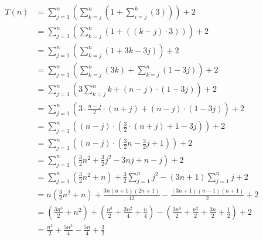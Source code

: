\documentclass{article}
\begin{document}
\begin{align*}
    T(n) &= \sum_{j=1}^{n} \left(
                \sum_{k=j}^{n}\left(
                    1 + \sum_{i=j}^{k}\left(3\right)
                \right)
            \right) + 2 \\
         &= \sum_{j=1}^{n} \left(
                \sum_{k=j}^{n}\left(
                    1 + ((k-j) \cdot 3)
                \right)
            \right) + 2 \\ 
        &= \sum_{j=1}^{n} \left(
                \sum_{k=j}^{n}\left(
                    1 + 3k - 3j
                \right)
            \right) + 2 \\
        &= \sum_{j=1}^{n} \left(
                \sum_{k=j}^{n}\left(
                    3k
                \right) +
                \sum_{k=j}^{n}\left(
                    1 - 3j
                \right)
            \right) + 2 \\
        &= \sum_{j=1}^{n} \left(
                3 \sum_{k=j}^{n}
                    k
                 +
                (n-j) \cdot (1 - 3j)
            \right) + 2 \\
        &= \sum_{j=1}^{n} \left(
                3 \cdot \frac{n-j}{2} \cdot (n + j)
                 +
                (n-j) \cdot (1 - 3j)
            \right) + 2 \\
        &= \sum_{j=1}^{n} \left(
                (n-j) \cdot \left(
                    \frac{3}{2} \cdot (n + j)
                    + 1 - 3j
                \right)
            \right) + 2 \\
        &= \sum_{j=1}^{n} \left(
                (n-j) \cdot \left(
                    \frac{3}{2} n
                    - \frac{3}{2}j
                    + 1
                \right)
            \right) + 2 \\
        &= \sum_{j=1}^{n} \left(
                \frac{3}{2} n^2
                + \frac{3}{2} j^2
                - 3 nj
                + n
                - j
            \right) + 2 \\
        &= \sum_{j=1}^{n} \left(
                \frac{3}{2} n^2
                + n
            \right)
            +
            \frac{3}{2}
            \sum_{j=1}^{n}
                j^2
            -
            (3n + 1)
            \sum_{j=1}^{n}
                j
            + 2 \\
        &= n \left(
                \frac{3}{2} n^2
                + n
            \right)
            +
            \frac{3n (n+1) (2n+1)}{12}
            -
            \frac{(3n + 1) (n-1)(n+1)}{2}
            + 2 \\
        &= \left(
                \frac{3n^3}{2}
                + n ^2
            \right)
            + \left(
                \frac{n^3}{2} + \frac{3n^2}{4} + \frac{n}{4}
            \right)
            - \left(
                \frac{3n^3}{2} + \frac{n^2}{2} + \frac{3n}{2} + \frac{1}{2}
            \right)
            + 2 \\
        &= \frac{n^3}{2}
            + \frac{5n^2}{4}
            - \frac{5n}{4}
            + \frac{3}{2}
\end{align*}
\end{document}
